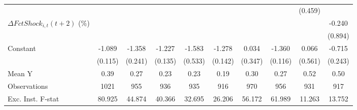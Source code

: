 {\begin{tabular}{l*{9}{c}}
                    &                     &                     &                     &                     &                     &                     &                     &     (0.459)         &                     \\
\addlinespace
$ \Delta FctShock_{i,t}(t+2)$ (\%)&                     &                     &                     &                     &                     &                     &                     &                     &      -0.240         \\
                    &                     &                     &                     &                     &                     &                     &                     &                     &     (0.894)         \\
\addlinespace
Constant            &      -1.089\sym{***}&      -1.358\sym{***}&      -1.227\sym{***}&      -1.583\sym{***}&      -1.278\sym{***}&       0.034         &      -1.360\sym{***}&       0.066         &      -0.715\sym{***}\\
                    &     (0.115)         &     (0.241)         &     (0.135)         &     (0.533)         &     (0.142)         &     (0.347)         &     (0.116)         &     (0.561)         &     (0.243)         \\
\midrule
Mean Y              &        0.39         &        0.27         &        0.23         &        0.23         &        0.19         &        0.30         &        0.27         &        0.52         &        0.50         \\
Observations        &        1021         &         955         &         936         &         935         &         916         &         970         &         956         &         931         &         917         \\
Exc. Inst. F-stat   &      80.925         &      44.874         &      40.366         &      32.695         &      26.206         &      56.172         &      61.989         &      11.263         &      13.752         \\
\bottomrule
\end{tabular}
}

